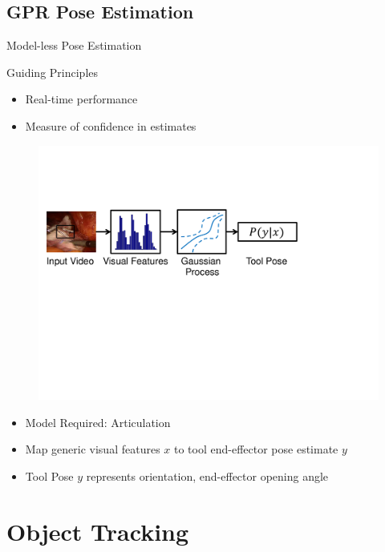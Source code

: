 \subsection[]{GPR Pose Estimation}
\begin{frame}{Model-less Pose Estimation}
\begin{block}{Guiding Principles}
\begin{itemize}
\item Real-time performance
\item Measure of confidence in estimates
\end{itemize}
\end{block}

\begin{figure}
\includegraphics[scale=0.5,trim=5mm 100mm 60mm 50mm,clip]{figures/surgical/flow_chart}
\end{figure}

\begin{itemize}
\item Model Required: Articulation
\item Map generic visual features $x$ to tool end-effector pose estimate $y$
\item Tool Pose $y$ represents orientation, end-effector opening angle
\end{itemize}

\end{frame}

\section{Object Tracking}
